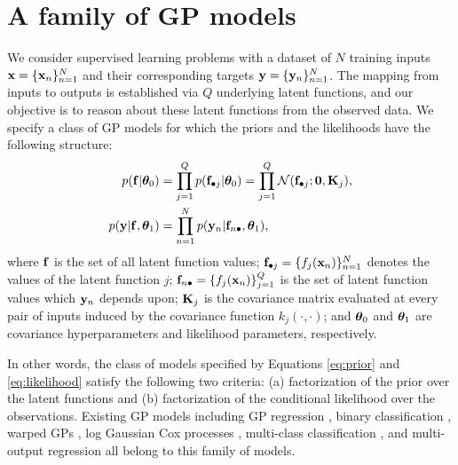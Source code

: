 \section{A family of GP models \label{sec:gpfamily}}
We consider supervised learning problems with a dataset  of
$N$ training inputs $\mathbf{x} = \{\mathbf{x}_n\}_{n=1}^N$ and their corresponding 
targets $\mathbf{y} = \{\mathbf{y}_n\}_{n=1}^N$.
The mapping from  inputs to outputs is established via $Q$ underlying latent functions, and our 
objective is to reason about  these latent functions  from the observed data.
%
We specify a class of GP models for which the priors and the likelihoods have the following structure:
\begin{align}
\label{eq:prior}
p(\mathbf{f} | \boldsymbol{\theta}_{0}) &= \prod_{j=1}^Q p(\mathbf{f}_{\bullet j} | \boldsymbol{\theta}_{0}) = \prod_{j=1}^Q \mathcal{N}(\mathbf{f}_{\bullet j}; \mathbf{0}, \mathbf{K}_j) \text{,} \\
\label{eq:likelihood}
p(\mathbf{y} | \mathbf{f}, \boldsymbol{\theta}_{1}) &= \prod_{n=1}^N p(\mathbf{y}_n | \mathbf{f}_{n \bullet}, \boldsymbol{\theta}_{1}) \text{,}
\end{align}
where $\mathbf{f}$ is the set of all latent function values; $\mathbf{f}_{\bullet j} = \{f_j(\mathbf{x}_n)\}_{n=1}^N$ denotes the values of the latent function $j$; $\mathbf{f}_{n \bullet} = \{f_j(\mathbf{x}_n)\}_{j=1}^Q$ is the set of latent function values  which $\mathbf{y}_n$ depends upon; $\mathbf{K}_j$ is the covariance matrix evaluated at every pair of inputs 
induced by the covariance function $k_j(\cdot,\cdot)$; and $\boldsymbol{\theta}_{0}$ and $\boldsymbol{\theta}_{1}$ are covariance 
hyperparameters and likelihood parameters, respectively.

In other words, the class of models specified by Equations \eqref{eq:prior} and \eqref{eq:likelihood}
satisfy the following two criteria: 
(a) factorization of the  prior  over the latent functions  
and (b) factorization of the conditional likelihood  over the observations.
Existing GP models including GP regression \cite{rasmussen-williams-book}, binary classification \cite{nickisch2008approximations,williams1998bayesian}, warped GPs \cite{snelson2003warped}, log Gaussian Cox processes \cite{moller1998log}, multi-class classification \cite{williams1998bayesian}, and multi-output regression \cite{wilson-et-al-icml-12} all 
belong to this family of models.


